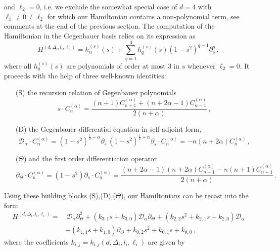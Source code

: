 \documentclass{article}
\def \Dg {\Delta}
\def \ds {\partial}
\def \ag {\alpha}
\begin{document}
and $\ell_2 = 0$, i.e. we exclude the somewhat special case of $d=4$ with $\ell_1 \neq 0 
\neq \ell_2$ for which our Hamiltonian contains a non-polynomial term, see comments at the 
end of the previous section. The computation of the Hamiltonian in the Gegenbauer basis 
relies on its expression as
\begin{equation}
    H^{(d,\Dg_i,l_i,\ell_i)} = h_0^{(s)}(s) + \sum_{q=1}^4 h_q^{(s)}(s) (1-s^2)^{q-1} \ds_s^q\,,
    \label{H_s_var}
\end{equation}
where all $h_q^{(s)}(s)$ are polynomials of order at most $3$ in $s$ whenever $\ell_2 = 0$. 
It proceeds with the help of three well-known identities:
\begin{itemize}
\item[(S)] the recursion relation of Gegenbauer polynomials
\begin{equation}
s \cdot C_n^{(\ag)} = \frac{(n+1) C_{n+1}^{(\ag)} + (n+ 2\ag -1) C_{n-1}^{(\ag)}}{2(n+\ag)}\,,
\label{recGeg}
\end{equation}
\item[(D)] the Gegenbauer differential equation in self-adjoint form,
\begin{equation}
\mathcal{D}_{\ag} \cdot C_n^{(\ag)} = (1-s^2)^{\frac{1}{2}-\ag} \ds_s \, (1-s^2)^{\frac{1}{2}+\ag} \ds_s \cdot C_n^{(\ag)} = - n(n+2\ag) C_n^{(\ag)}\,,
\label{stlGeg}
\end{equation}
\item[($\Theta$)] and the first order differentiation operator 
\begin{equation}
\ds_{\Theta} \cdot C_n^{(\ag)} = (1-s^2) \ds_s  \cdot C_n^{(\ag)} = \frac{(n+2\ag-1)(n+2\ag) C_{n-1}^{(\ag)} - n(n+1) C_{n+1}^{(\ag)}}{2(n+\ag)}\,.
\label{dphGeg}
\end{equation}
\end{itemize}
Using these building blocks (S),(D),($\Theta$), our Hamiltonians can be recast into the form 
\begin{align}
H^{(d,\Dg_i,l_i,\ell_i)}  = &\, \mathcal{D}_{\ag} \ds_{\Theta}^2 + \left( k_{3,1}s + k_{3,0} \right) \mathcal{D}_{\ag} \ds_{\Theta} + \left( k_{2,2} s^2 + k_{2,1} s + k_{2,0} \right) \mathcal{D}_{\ag} \nonumber \\
&+ \left( k_{1,1} s + k_{1,0} \right) \ds_{\Theta} + k_{0,2} s^2 + k_{0,1} s + k_{0,0}\,, \label{algebraicExpGeg}
\end{align}
where the coefficients $k_{i,j} = k_{i,j}(d,\Dg_i,l_i,\ell_i)$ are given by 
\end{document}
